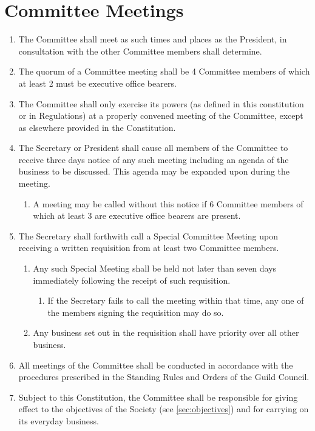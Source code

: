 \documentclass[a4paper]{article}
\begin{document}
\section{Committee Meetings}
\begin{enumerate}
    \item The Committee shall meet as such times and places as the President, in consultation with the other Committee members shall determine.
    \item The quorum of a Committee meeting shall be 4 Committee members of which at least 2 must be executive office bearers.
    \item The Committee shall only exercise its powers (as defined in this constitution or in Regulations) at a properly convened meeting of the Committee, except as elsewhere provided in the Constitution.
    \item The Secretary or President shall cause all members of the Committee to receive three days notice of any such meeting including an agenda of the business to be discussed. This agenda may be expanded upon during the meeting.
    \begin{enumerate}
        \item A meeting may be called without this notice if 6 Committee members of which at least 3 are executive office bearers are present.
    \end{enumerate}
    \item The Secretary shall forthwith call a Special Committee Meeting upon receiving a written requisition from at least two Committee members.
    \begin{enumerate}
        \item Any such Special Meeting shall be held not later than seven days immediately following the receipt of such requisition.
        \begin{enumerate}
            \item If the Secretary fails to call the meeting within that time, any one of the members signing the requisition may do so. 
        \end{enumerate}
        \item Any business set out in the requisition shall have priority over all other business.
    \end{enumerate}
    \item All meetings of the Committee shall be conducted in accordance with the procedures prescribed in the Standing Rules and Orders of the Guild Council.
    \item Subject to this Constitution, the Committee shall be responsible for giving effect to the objectives of the Society (see \cref{sec:objectives}) and for carrying on its everyday business.

\end{enumerate}
\end{document}
